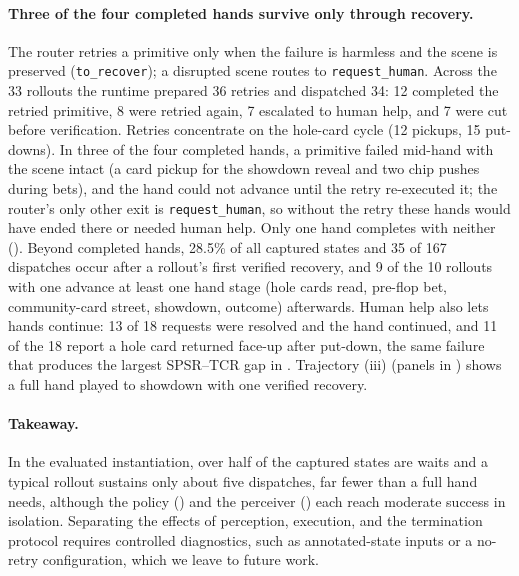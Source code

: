 \paragraph{Three of the four completed hands survive only through recovery.} The router retries a primitive only when the failure is harmless and the scene is preserved (\texttt{to\_recover}); a disrupted scene routes to \texttt{request\_human}. Across the 33 rollouts the runtime prepared 36 retries and dispatched 34: 12 completed the retried primitive, 8 were retried again, 7 escalated to human help, and 7 were cut before verification. Retries concentrate on the hole-card cycle (12 pickups, 15 put-downs). In three of the four completed hands, a primitive failed mid-hand with the scene intact (a card pickup for the showdown reveal and two chip pushes during bets), and the hand could not advance until the retry re-executed it; the router's only other exit is \texttt{request\_human}, so without the retry these hands would have ended there or needed human help. Only one hand completes with neither (). Beyond completed hands, 28.5\% of all captured states and 35 of 167 dispatches occur after a rollout's first verified recovery, and 9 of the 10 rollouts with one advance at least one hand stage (hole cards read, pre-flop bet, community-card street, showdown, outcome) afterwards. Human help also lets hands continue: 13 of 18 requests were resolved and the hand continued, and 11 of the 18 report a hole card returned face-up after put-down, the same failure that produces the largest SPSR--TCR gap in . Trajectory (iii) (panels in ) shows a full hand played to showdown with one verified recovery.

\paragraph{Takeaway.} In the evaluated instantiation, over half of the captured states are waits and a typical rollout sustains only about five dispatches, far fewer than a full hand needs, although the policy () and the perceiver () each reach moderate success in isolation. Separating the effects of perception, execution, and the termination protocol requires controlled diagnostics, such as annotated-state inputs or a no-retry configuration, which we leave to future work.
